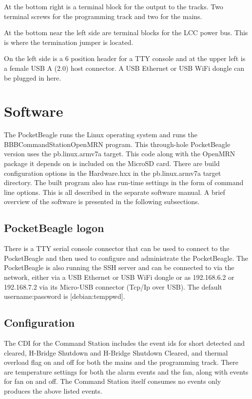 At the bottom right is a terminal block for the output to the tracks.  Two 
terminal screws for the programming track and two for the mains.

At the bottom near the left side are terminal blocks for the LCC power bus.  
This is where the termination jumper is located.

On the left side is a 6 position header for a TTY console and at the upper 
left is a female USB A (2.0) host connector.  A USB Ethernet or USB WiFi 
dongle can be plugged in here.

\section{Software}

The PocketBeagle runs the Linux operating system and runs the
BBBCommandStationOpenMRN program. This through-hole PocketBeagle version uses
the pb.linux.armv7a target. This code along with the OpenMRN package it
depends on is included on the MicroSD card. There are build configuration
options in the Hardware.hxx in the pb.linux.armv7a target directory. The built
program also has run-time settings in the form of command line options. This
is all described in the separate software manual. A brief overview of the
software is presented in the following subsections.

\subsection{PocketBeagle logon}

There is a TTY serial console connector that can be used to connect to the 
PocketBeagle and then used to configure and administrate the PocketBeagle. The 
PocketBeagle is also running the SSH server and can be connected to via the 
network, either via a  USB Ethernet or USB WiFi dongle or as 192.168.6.2 or 
192.168.7.2 via its Micro-USB connector (Tcp/Ip over USB).  The default 
username:password is [debian:temppwd].

\subsection{Configuration}

The CDI for the Command Station includes the event ids for short detected and 
cleared, H-Bridge Shutdown and H-Bridge Shutdown Cleared, and thermal overload 
flag on and off for both the mains and the programming track.  There are 
temperature settings for both the alarm events and the fan, along with events 
for fan on and off.  The Command Station itself consumes no events only 
produces the above listed events.

